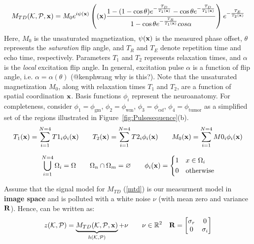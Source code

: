 \documentclass{article}         %
\theoremstyle{definition}
\theoremstyle{remark}
\newcommand{\eqn}[1]{(\ref{#1})}
\begin{document}
\begin{equation}\label{mtd}
M_{TD}(\mathcal{K},\mathcal{P},\mathbf{x})=
   M_0 e^{i\psi(\mathbf{x})}
\left(
 (\mathbf{x})\frac{1-(1-\cos \theta)e^{-\frac{T_D}{T_1(\mathbf{x})}}-\cos \theta e^{-\frac{T_D}{T_1(\mathbf{x})}}}{1-\cos \theta e^{-\frac{T_R}{T_1(\mathbf{x})}}cos \alpha}
 \right) e^{-\frac{T_E}{T_2(\mathbf{x})}}
\end{equation}
Here, $M_0$ is the unsaturated magnetization, $\psi(\mathbf{x})$ is the measured phase offset,
$\theta$ represents the \textit{saturation} flip
angle, and $T_R$ and $T_E$ denote repetition time and echo time, respectively.
Parameters $T_1$ and $T_2$ represents relaxation times, and $\alpha$ is the
\textit{local} excitation flip angle. 
In general, excitation pulse $\alpha$ is a function of flip angle, i.e.
$\alpha=\alpha(\theta)$
{\color{red}(@kenphwang why is this?)}.
Note that the unsaturated magnetization $M_0$, along with
relaxation times $T_1$ and $T_2$, are a function of spatial coordination $\mathbf{x}$.
Basis functions $\phi_i$ represent the neuroanatomy. For completeness, consider
$\phi_1 = \phi_\text{gm}$,
$\phi_2 = \phi_\text{wm}$,
$\phi_3 = \phi_\text{csf}$,
$\phi_4 = \phi_\text{tumor}$ as a simplified set 
of the regions illustrated in Figure~\ref{fig:Pulsesequence}(b).
\[
T_1(\mathbf{x})=\sum_{i=1}^{N=4} T1_i \phi_i(\mathbf{x})
\qquad
T_2(\mathbf{x})=\sum_{i=1}^{N=4} T2_i \phi_i(\mathbf{x})
\qquad
M_0(\mathbf{x})=\sum_{i=1}^{N=4} M0_i \phi_i(\mathbf{x})
\]
	
	
\[
\bigcup_{i=1}^{N=4}\Omega_i=\Omega  \qquad  \Omega_n\cap\Omega_m=\varnothing
\qquad 
\phi_i(\mathbf{x})=\left\{ \begin{split}
			1 & \quad x\in\Omega_i \\
			0 & \quad \text{otherwise}
                     \end{split} \right. 
\]


Assume that the signal model  for $M_{TD}$ \eqn{mtd} is our measurment model in \textbf{image space}
and is polluted with a white noise $\nu$ (with mean zero and variance $\mathbf{R}$). Hence,  can be written as:
\begin{equation}\label{mtdobs}
z(\mathcal{K},\mathcal{P})=\underbrace{M_{TD}(\mathcal{K},\mathcal{P},\mathbf{x})}_{h(\mathcal{K},\mathcal{P})}+\nu
\qquad
\nu \in \mathbb{R}^2
\quad 
\mathbf{R} = 
\begin{bmatrix}
\sigma_r &      0    \\
    0    & \sigma_i  \\
\end{bmatrix}
\end{equation}
\end{document}

